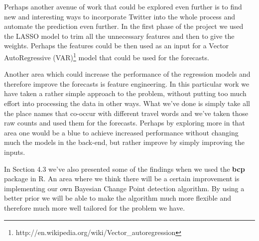 \documentclass[minf,twoside,singlespacing,parskip,frontabs,notimes,12pt]{infthesis} %
\begin{document}
Perhaps another avenue of work that could be explored even further is to find new and interesting ways to incorporate Twitter into the whole process and automate the prediction even further. In the first phase of the project we used the LASSO model to trim all the unnecessary features and then to give the weights. Perhaps the features could be then used as an input for a Vector AutoRegressive (VAR)\footnote{http://en.wikipedia.org/wiki/Vector\_autoregression} model that could be used for the forecasts. 

Another area which could increase the performance of the regression models and therefore improve the forecasts is feature engineering. In this particular work we have taken a rather simple approach to the problem, without putting too much effort into processing the data in other ways. What we've done is simply take all the place names that co-occur with different travel words and we've taken those raw counts and used them for the forecasts. Perhaps by exploring more in that area one would be a blue to achieve increased performance without changing much the models in the back-end, but rather improve by simply improving the inputs.

In Section 4.3 we've also presented some of the findings when we used the \textbf{bcp} package in R. An area where we think there will be a certain improvement is implementing our own Bayesian Change Point detection algorithm. By using a better prior we will be able to make the algorithm much more flexible and therefore much more well tailored for the problem we have. 

\raggedright
\sloppy


\end{document}
